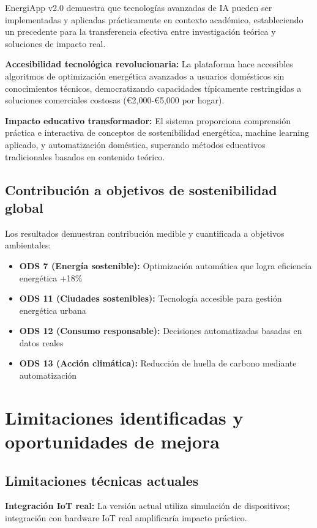 EnergiApp v2.0 demuestra que tecnologías avanzadas de IA pueden ser implementadas y aplicadas prácticamente en contexto académico, estableciendo un precedente para la transferencia efectiva entre investigación teórica y soluciones de impacto real.

\textbf{Accesibilidad tecnológica revolucionaria:} La plataforma hace accesibles algoritmos de optimización energética avanzados a usuarios domésticos sin conocimientos técnicos, democratizando capacidades típicamente restringidas a soluciones comerciales costosas (€2,000-€5,000 por hogar).

\textbf{Impacto educativo transformador:} El sistema proporciona comprensión práctica e interactiva de conceptos de sostenibilidad energética, machine learning aplicado, y automatización doméstica, superando métodos educativos tradicionales basados en contenido teórico.

\subsection{Contribución a objetivos de sostenibilidad global}

Los resultados demuestran contribución medible y cuantificada a objetivos ambientales:

\begin{itemize}
    \item \textbf{ODS 7 (Energía sostenible):} Optimización automática que logra eficiencia energética +18\%
    \item \textbf{ODS 11 (Ciudades sostenibles):} Tecnología accesible para gestión energética urbana
    \item \textbf{ODS 12 (Consumo responsable):} Decisiones automatizadas basadas en datos reales
    \item \textbf{ODS 13 (Acción climática):} Reducción de huella de carbono mediante automatización
\end{itemize}

\section{Limitaciones identificadas y oportunidades de mejora}

\subsection{Limitaciones técnicas actuales}

\textbf{Integración IoT real:} La versión actual utiliza simulación de dispositivos; integración con hardware IoT real amplificaría impacto práctico.

